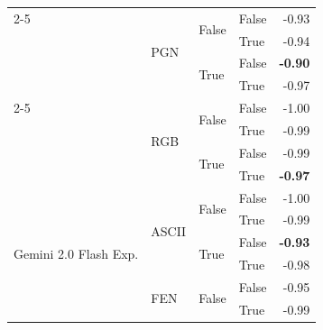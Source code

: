\documentclass{article}
\begin{document}
\begin{table}
\begin{center}
{\begin{tabular}{@{}llllr@{}}
    \cmidrule{2-5}
                                                & \multirow[c]{4}{*}{PGN}   & \multirow[c]{2}{*}{False} & False                     & -0.93 \\
                                                &                           &                           & True                      & -0.94 \\
                                                &                           & \multirow[c]{2}{*}{True}  & False                     & \textbf{-0.90} \\
                                                &                           &                           & True                      & -0.97 \\
    \cmidrule{2-5}
                                                & \multirow[c]{4}{*}{RGB}   & \multirow[c]{2}{*}{False} & False                     & -1.00 \\
                                                &                           &                           & True                      & -0.99 \\
                                                &                           & \multirow[c]{2}{*}{True}  & False                     & -0.99 \\
                                                &                           &                           & True                      & \textbf{-0.97} \\
    \midrule
    \multirow[c]{17}{*}{Gemini 2.0 Flash Exp.}  & \multirow[c]{4}{*}{ASCII} & \multirow[c]{2}{*}{False} & False                     & -1.00 \\
                                                &                           &                           & True                      & -0.99 \\
                                                &                           & \multirow[c]{2}{*}{True}  & False                     & \textbf{-0.93} \\
                                                &                           &                           & True                      & -0.98 \\
    \cmidrule{2-5}
                                                & \multirow[c]{4}{*}{FEN}   & \multirow[c]{2}{*}{False} & False                     & -0.95 \\
                                                &                           &                           & True                      & -0.99 \\

\end{tabular}}
\end{center}
\end{table}
\end{document}

